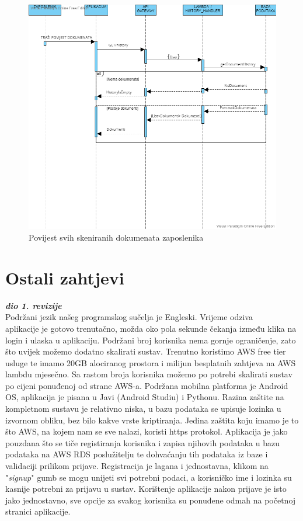 			\begin{figure}
				\includegraphics[width=\linewidth]{./dijagrami/History.png}
				\caption{Povijest svih skeniranih dokumenata zaposlenika}
				\label{fig:History}
			\end{figure}
			
		\section{Ostali zahtjevi}
		
			\textbf{\textit{dio 1. revizije}}\\
		 
			 
			 Podržani jezik našeg programskog sučelja je Engleski. Vrijeme odziva\\ aplikacije je gotovo trenutačno, možda oko pola sekunde čekanja između klika na login i ulaska u aplikaciju. Podržani broj korisnika nema gornje ograničenje, zato što uvijek možemo dodatno skalirati sustav. Trenutno koristimo AWS free tier usluge te imamo 20GB alociranog prostora i milijun besplatnih zahtjeva na AWS lambdu mjesečno. Sa rastom broja korisnika možemo po potrebi skalirati sustav po cijeni ponuđenoj od strane AWS-a. Podržana mobilna platforma je Android OS, aplikacija je pisana u Javi (Android Studiu) i Pythonu. Razina zaštite na\\ kompletnom sustavu je relativno niska, u bazu podataka se upisuje lozinka u\\ izvornom obliku, bez bilo kakve vrste kriptiranja. Jedina zaštita koju imamo je to što AWS, na kojem nam se sve nalazi, koristi https protokol. Aplikacija je jako pouzdana što se tiče registiranja korisnika i zapisa njihovih podataka u bazu podataka na AWS RDS poslužitelju te dohvaćanju tih podataka iz baze i validaciji prilikom prijave. Registracija je lagana i jednostavna, klikom na "\textit{signup}" gumb se mogu unijeti svi potrebni podaci, a korisničko ime i lozinka su kasnije potrebni za prijavu u sustav.
			 Korištenje aplikacije nakon prijave je isto jako jednostavno, sve opcije za svakog korisnika su ponuđene odmah na početnoj stranici aplikacije.
			 
			 
			 
	